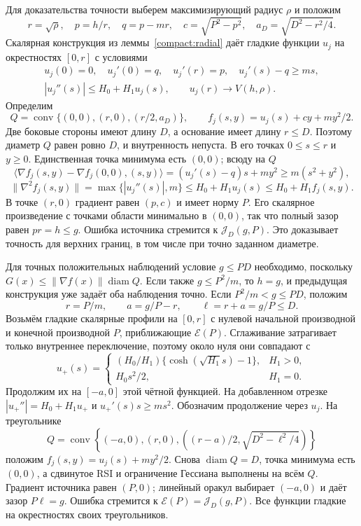 Для доказательства точности выберем максимизирующий радиус
$\rho$ и положим
\[
 r=\sqrt\rho,\quad p=h/r,\quad q=p-mr,\quad
 c=\sqrt{P^2-p^2},\quad a_D=\sqrt{D^2-r^2/4}.
\]
Скалярная конструкция из леммы~\ref{compact:radial}
даёт гладкие функции $u_j$ на окрестностях $[0,r]$ с условиями
\[
 \begin{gathered}
 u_j(0)=0,\quad u_j'(0)=q,\quad u_j'(r)=p,\quad
 u_j'(s)-q\ge ms,\\
 |u_j''(s)|\le H_0+H_1u_j(s),\qquad
 u_j(r)\longrightarrow V(h,\rho).
 \end{gathered}
\]
Определим
\[
 Q=\operatorname{conv}\{(0,0),(r,0),(r/2,a_D)\},\qquad
 f_j(s,y)=u_j(s)+cy+my^2/2.
\]
Две боковые стороны имеют длину $D$, а основание имеет длину
$r\le D$. Поэтому диаметр $Q$ равен ровно $D$, и внутренность
непуста. В его точках $0\le s\le r$ и $y\ge0$.
Единственная точка минимума есть $(0,0)$; всюду на $Q$
\[
 \langle\nabla f_j(s,y)-\nabla f_j(0,0),(s,y)\rangle
       =(u_j'(s)-q)s+my^2\ge m(s^2+y^2),
\]
\[
 \|\nabla^2f_j(s,y)\|
       =\max\{|u_j''(s)|,m\}
       \le H_0+H_1u_j(s)\le H_0+H_1f_j(s,y).
\]
В точке $(r,0)$ градиент равен $(p,c)$ и имеет норму $P$.
Его скалярное произведение с точками области минимально в
$(0,0)$, так что полный зазор равен $pr=h\le g$.
Ошибка источника стремится к $\mathcal J_D(g,P)$.
Это доказывает точность для верхних границ, в том числе при
точно заданном диаметре.

Для точных положительных наблюдений условие $g\le PD$
необходимо, поскольку
$G(x)\le\|\nabla f(x)\|\operatorname{diam}Q$.
Если также $g\le P^2/m$, то $h=g$, и предыдущая конструкция
уже задаёт оба наблюдения точно. Если $P^2/m<g\le PD$, положим
\[
 r=P/m,\qquad a=g/P-r,\qquad \ell=r+a=g/P\le D.
\]
Возьмём гладкие скалярные профили на $[0,r]$ с нулевой начальной
производной и конечной производной $P$, приближающие $\mathcal E(P)$.
Сглаживание затрагивает только внутреннее переключение,
поэтому около нуля они совпадают с
\[
 u_+(s)=
 \begin{cases}
 (H_0/H_1)\{\cosh(\sqrt{H_1}s)-1\},&H_1>0,\\
 H_0s^2/2,&H_1=0.
 \end{cases}
\]
Продолжим их на $[-a,0]$ этой чётной функцией. На добавленном
отрезке $|u_+''|=H_0+H_1u_+$ и $u_+'(s)s\ge ms^2$.
Обозначим продолжение через $u_j$. На треугольнике
\[
 Q=\operatorname{conv}\left\{(-a,0),(r,0),
       \left((r-a)/2,\sqrt{D^2-\ell^2/4}\right)\right\}
\]
положим $f_j(s,y)=u_j(s)+my^2/2$.
Снова $\operatorname{diam}Q=D$, точка минимума есть $(0,0)$,
а сдвинутое RSI и ограничение Гессиана выполнены на всём $Q$.
Градиент источника равен $(P,0)$; линейный оракул выбирает
$(-a,0)$ и даёт зазор $P\ell=g$. Ошибка стремится к
$\mathcal E(P)=\mathcal J_D(g,P)$.
Все функции гладкие на окрестностях своих треугольников.

